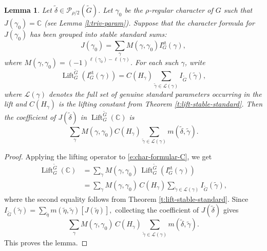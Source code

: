 \documentclass{amsart}
\DeclareMathOperator{\Lift}{Lift}
\newcommand{\bbC}{{\mathbb{C}}}
\newtheorem{lemma}[thm]{Lemma}
\theoremstyle{definition}
\newcommand{\tu}{\widetilde}
\begin{document}
\begin{lemma} \label{l:coefficient-formula}
Let $\tu\delta\in\mathcal P_{\rho/2}(\tu G)$.
Let $\gamma_0$ be the $\rho$-regular character of $G$ such that
$J(\gamma_0)=\bbC$ (see Lemma \ref{l:triv-param}). Suppose that the character formula for $J(\gamma_0)$ has
been grouped into stable standard sums:
\begin{equation} \label{e:char-formular-C}
J(\gamma_0)
=
\sum_{\gamma}
M(\gamma,\gamma_0)I_G^{\mathrm{st}}(\gamma), 
\end{equation}
where $M(\gamma,\gamma_0)= (-1)^{\ell(\gamma_0) -\ell(\gamma)}$. 
For each such $\gamma$, write
\begin{equation}
\Lift_G^{\tu G}(I_G^{\mathrm{st}}(\gamma))
=
C(H_\gamma)
\sum_{\tu\gamma\in\mathcal L(\gamma)}
I_{\tu G}(\tu\gamma),
\end{equation}
where $\mathcal L(\gamma)$ denotes the full set of genuine standard parameters
occurring in the lift and $C(H_\gamma)$ is the lifting constant from Theorem \ref{t:lift-stable-standard}. Then the coefficient of $J(\tu\delta)$ in
$\Lift_G^{\tu G}(\bbC)$ is
\begin{equation} \label{e:coeff}
\sum_{\gamma}
M(\gamma,\gamma_0)C(H_\gamma)
\sum_{\tu\gamma\in\mathcal L(\gamma)}
m(\tu\delta,\tu\gamma).
\end{equation}
\end{lemma}




\begin{proof}
Applying the lifting operator to \eqref{e:char-formular-C}, we get
\begin{align*}
\Lift_G^{\tu G}(\bbC)
&=
\sum_{\gamma}
M(\gamma,\gamma_0)\,
\Lift_G^{\tu G}(I_G^{\mathrm{st}}(\gamma))\\
&= \sum_{\gamma}
M(\gamma,\gamma_0)\, C(H_\gamma)
\sum_{\tu\gamma\in \mathcal L(\gamma)}
I_{\tu G}(\tu\gamma),
\end{align*}
where the second equality follows from Theorem \ref{t:lift-stable-standard}.
Since $I_{\tu G}(\tu\gamma)=
\sum\limits_{\tu\eta}
m(\tu\eta,\tu\gamma)[J(\tu\eta)],$ collecting the coefficient of $J(\tu\delta)$ gives 
\begin{equation*}
\sum_{\gamma}
M(\gamma,\gamma_0)\,C(H_\gamma)
\sum_{\tu\gamma\in \mathcal L(\gamma)}
m(\tu\delta,\tu\gamma).
\end{equation*}
This proves the lemma.
\end{proof}
\end{document}
